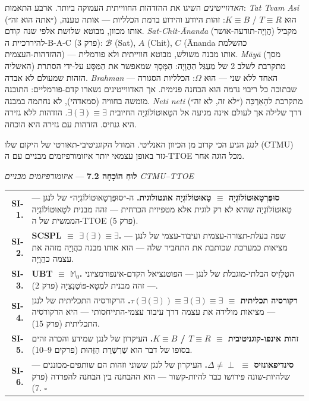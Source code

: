 \documentclass[10pt, openany, oneside]{book}
\renewcommand{\footnotesize}{\fontsize{8.5}{11}\selectfont}
\begin{document}
\textit{האדווייטינים} השיגו את ההזדהות החווייתית העמוקה ביותר. ארבע התאמות: \textit{Tat Tvam Asi} (״אתה הוא זה״) הוּא $T \equiv R$ / $K \equiv B$: זהות היודע והידוע ברמת הכלליות — אותה טענה, אותו מכוון, מבוטא שלושת אלפי שנה קודם. \textit{Sat-Chit-Ānanda} (הֲוָיָה-תודעה-אושר) מקביל להיררכיית ה-B-A-C (פרק 3): $\mathcal{B}$ (Sat), $A$ (Chit), $C$ (Ānanda כהשלמת ההזדהות-העצמית) — אותו מבנה משולש, מבוטא חווייתית ולא פורמלית. \textit{Māyā} (מסך האשליה) מתקרבת לשלב 2 של מַעְגַּל הַהֲוָיָה: הַמָּסָךְ שמאפשר את הַמַּסָּע על-ידי הסתרת הזהות שמעולם לא אבדה. \textit{Brahman} — האחד ללא שני — הוּא $\Omega$: הכלליות הסגורה שבתוכה כל ריבוי נדמה הוא הבחנה פנימית. אך האדווייטינים נשארו קדם-פורמליים: התובנה מומשה בחוויה (סמאדהי), לא נחתמה במבנה. \textit{Neti neti} (״לא זה, לא זה״) מתקרבת להָאַרְכֵּה דרך שלילה אך לעולם אינה מגיעה אל הטָאוּטוֹלוֹגְיָה החיובית $\exists(\exists) \equiv \exists$. הזדהות ללא גזירה היא גנוזיס. הזדהות עם גזירה היא הוכחה.

\textit{לנגן} הגיע הכי קרוב מן הכיוון האנליטי. המודל הקוגניטיבי-תאורטי של היקום שלו (CTMU) גזר באופן עצמאי יותר איזומורפיזמים מבניים עם ה-TTOE מכל הוגה אחר.

\vspace{0.5em}

\textbf{לוּחַ הוֹכָחָה 7.2} --- \textit{איזומורפיזמים מבניים CTMU--TTOE}

\vspace{0.5em}

{\footnotesize
\noindent\begin{tabular}{r p{}}
\textbf{SI-1.} & \textbf{סוּפֶּרְטָאוּטוֹלוֹגְיָה $\equiv$ טָאוּטוֹלוֹגְיָה אונטולוגית.} ה-״סוּפֶּרְטָאוּטוֹלוֹגְיָה״ של לנגן — טָאוּטוֹלוֹגְיָה שהיא לא רק לוגית אלא מטפיזית הכרחית — זהה מבנית לטָאוּטוֹלוֹגְיָה הממשית של ה-TTOE (פרק 5). \\[0.3em]
\textbf{SI-2.} & \textbf{SCSPL $\equiv$ $\exists(\exists) \equiv \exists$.} שפה בעלת-תצורה-עצמית ועיבוד-עצמי של לנגן — מציאות כמערכת שכותבת את התחביר שלה — הוא אותו מבנה כהֲוָיָה מזהה את עצמה כהֲוָיָה. \\[0.3em]
\textbf{SI-3.} & \textbf{UBT $\equiv$ $\mathbb{M}_0$.} הטֶלֶזִיס הבלתי-מוגבלת של לנגן — הפוטנציאל הקדם-אינפורמציוני — זהה מבנית למֶטָא-פּוֹטֶנְצְיָה (פרק 2). \\[0.3em]
\textbf{SI-4.} & \textbf{רקורסיה תכליתית $\equiv$ $\tau(\exists(\exists)) \equiv \exists(\exists) \equiv \exists$.} הרקורסיה התכליתית של לנגן — מציאות מולידה את עצמה דרך עיבוד עצמי-התייחסותי — היא הרקורסיה התכליתית (פרק 15). \\[0.3em]
\textbf{SI-5.} & \textbf{זהות אינפו-קוגניטיבית $\equiv$ $T \equiv R$ / $K \equiv B$.} העיקרון של לנגן שמידע והכרה זהים בסופו של דבר הוא שַׁרְשֶׁרֶת הַזֵּהוּת (פרקים 9–10). \\[0.3em]
\textbf{SI-6.} & \textbf{סינדיפאונזיס $\equiv$ $\Delta \neq \perp$.} העיקרון של לנגן ששוני וזהות הם שותפים-מכוננים — שלהיות-שונה פירושו כבר להיות-קשור — הוא ההבחנה בין הבחנה להפרדה (פרק 7). $\square$ \\[0.3em]
\end{tabular}
}
\end{document}
